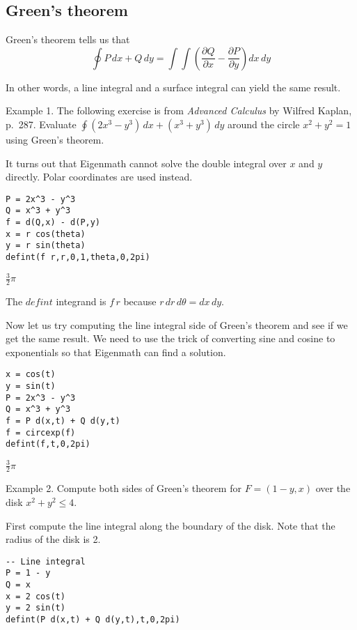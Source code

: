 
\subsection{Green's theorem}
Green's theorem tells us that
$$\oint P\,dx+Q\,dy=\int\!\!\!\int
\left(\frac{\partial Q}{\partial x}-\frac{\partial P}{\partial y}\right)
dx\,dy$$

\noindent
In other words, a line integral and a surface integral can yield
the same result.

\bigskip
\noindent
Example 1.
The following exercise is from {\it Advanced Calculus}
by Wilfred Kaplan, p.~287.
Evaluate $\oint (2x^3-y^3)\,dx+(x^3+y^3)\,dy$ around the circle
$x^2+y^2=1$ using Green's theorem.

\bigskip
\noindent
It turns out that Eigenmath cannot solve the double integral over
$x$ and $y$ directly.
Polar coordinates are used instead.

\begin{Verbatim}[formatcom=\color{blue},samepage=true]
P = 2x^3 - y^3
Q = x^3 + y^3
f = d(Q,x) - d(P,y)
x = r cos(theta)
y = r sin(theta)
defint(f r,r,0,1,theta,0,2pi)
\end{Verbatim}

\noindent
$\displaystyle \tfrac{3}{2}\pi$

\bigskip
\noindent
The $defint$ integrand is $f\,r$ because $r\,dr\,d\theta=dx\,dy$.

\bigskip
\noindent
Now let us try computing the line integral side of Green's theorem
and see if we get the same result.
We need to use the trick of converting sine and cosine to exponentials
so that Eigenmath can find a solution.

\begin{Verbatim}[formatcom=\color{blue},samepage=true]
x = cos(t)
y = sin(t)
P = 2x^3 - y^3
Q = x^3 + y^3
f = P d(x,t) + Q d(y,t)
f = circexp(f)
defint(f,t,0,2pi)
\end{Verbatim}

\noindent
$\displaystyle \tfrac{3}{2}\pi$

\bigskip
\noindent
Example 2.
Compute both sides of Green's theorem for
$F=(1-y,x)$ over the disk $x^2+y^2\le4$.

\bigskip
\noindent
First compute the line integral along the boundary of the disk.
Note that the radius of the disk is 2.

\begin{Verbatim}[formatcom=\color{blue},samepage=true]
-- Line integral
P = 1 - y
Q = x
x = 2 cos(t)
y = 2 sin(t)
defint(P d(x,t) + Q d(y,t),t,0,2pi)
\end{Verbatim}

